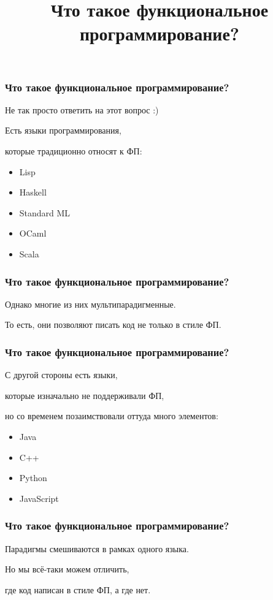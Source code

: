 \documentclass[10pt]{beamer}
\title{Что такое функциональное программирование?}
\begin{document}
\begin{frame}
  \frametitle{Что такое функциональное программирование?}
  Не так просто ответить на этот вопрос :)
  \par \bigskip
  Есть языки программирования,
  \par \bigskip
  которые традиционно относят к ФП:
  \par \bigskip
  \begin{itemize}
  \item Lisp
  \item Haskell
  \item Standard ML
  \item OCaml
  \item Scala
  \end{itemize}
\end{frame}

\begin{frame}
  \frametitle{Что такое функциональное программирование?}
  Однако многие из них мультипарадигменные.
  \par \bigskip
  То есть, они позволяют писать код не только в стиле ФП.
\end{frame}

\begin{frame}
  \frametitle{Что такое функциональное программирование?}
  С другой стороны есть языки,
  \par \bigskip
  которые изначально не поддерживали ФП,
  \par \bigskip
  но со временем позаимствовали оттуда много элементов:
  \par \bigskip
  \begin{itemize}
  \item Java
  \item C++
  \item Python
  \item JavaScript
  \end{itemize}
\end{frame}

\begin{frame}
  \frametitle{Что такое функциональное программирование?}
  Парадигмы смешиваются в рамках одного языка.
  \par \bigskip
  Но мы всё-таки можем отличить,
  \par \bigskip
  где код написан в стиле ФП, а где нет.
\end{frame}
\end{document}
